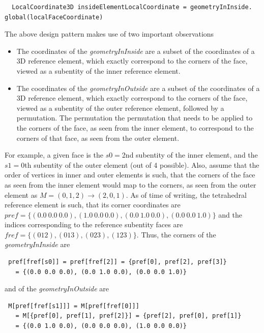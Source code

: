 \begin{mybox}
\begin{lstlisting}
  LocalCoordinate3D insideElementLocalCoordinate = geometryInInside. global(localFaceCoordinate)
\end{lstlisting}
\end{mybox}

\noindent
The above design pattern makes use of two important observations
\begin{itemize}
 \item The coordinates of the \textit{geometryInInside} are a subset of the coordinates of a 3D reference element, which exactly correspond to the corners of the face, viewed as a subentity of the inner reference element.
 \item The coordinates of the \textit{geometryInOutside} are a subset of the coordinates of a 3D reference element, which exactly correspond to the corners of the face, viewed as a subentity of the outer reference element, followed by a permutation. The permutation the permutation that needs to be applied to the corners of the face, as seen from the inner element, to correspond to the corners of that face, as seen from the outer element.
\end{itemize}

\noindent
For example, a given face is the $s0=$2nd subentity of the inner element, and the $s1=$0th subentity of the outer element (out of 4 possible). Also, assume that the order of vertices in inner and outer elements is such, that the corners of the face as seen from the inner element would map to the corners, as seen from the outer element as $M = (0,1,2) \rightarrow (2,0,1)$. As of time of writing, the \dune{} tetrahedral reference element is such, that its corner coordinates are $pref=\{(0.0\ 0.0\ 0.0), (1.0\ 0.0\ 0.0), (0.0\ 1.0\ 0.0), (0.0\ 0.0\ 1.0)\}$ and the indices corresponding to the reference subentity faces are $fref=\{(0 1 2), (0 1 3), (0 2 3), (1 2 3)\}$. Thus, the corners of the \textit{geometryInInside} are

\begin{mybox}
\begin{lstlisting}
 pref[fref[s0]] = pref[fref[2]] = {pref[0], pref[2], pref[3]}
   = {(0.0 0.0 0.0), (0.0 1.0 0.0), (0.0 0.0 1.0)}
\end{lstlisting}
\end{mybox}

\noindent
and of the \textit{geometryInOutside} are
\begin{mybox}
\begin{lstlisting}
 M[pref[fref[s1]]] = M[pref[fref[0]]]
   = M[{pref[0], pref[1], pref[2]}] = {pref[2], pref[0], pref[1]}
   = {(0.0 1.0 0.0), (0.0 0.0 0.0), (1.0 0.0 0.0)}
\end{lstlisting}
\end{mybox}

